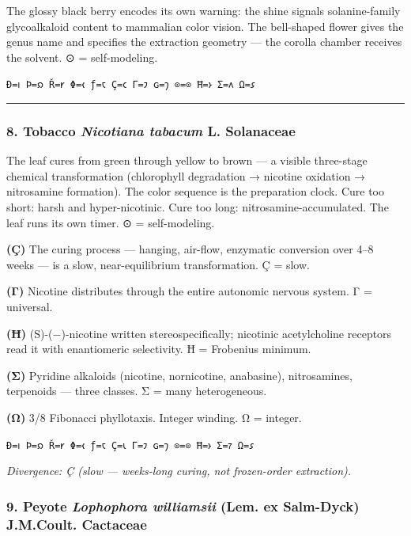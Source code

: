 The glossy black berry encodes its own warning: the shine signals
solanine-family glycoalkaloid content to mammalian color vision. The
bell-shaped flower gives the genus name and specifies the extraction
geometry --- the corolla chamber receives the solvent. ⊙ =
self-modeling.

\texttt{Ð=𐑦\ Þ=𐑸\ Ř=𐑾\ Φ=𐑬\ ƒ=𐑱\ Ç=𐑤\ Γ=𐑲\ ɢ=𐑠\ ⊙=⊙\ Ħ=𐑶\ Σ=𐑵\ Ω=𐑭}

\begin{center}\rule{0.5\linewidth}{0.5pt}\end{center}

\hypertarget{tobacco-nicotiana-tabacum-l.-solanaceae}{%
\subsubsection{\texorpdfstring{8. Tobacco \textbar{} \emph{Nicotiana
tabacum} L. \textbar{}
Solanaceae}{8. Tobacco \textbar{} Nicotiana tabacum L. \textbar{} Solanaceae}}\label{tobacco-nicotiana-tabacum-l.-solanaceae}}

The leaf cures from green through yellow to brown --- a visible
three-stage chemical transformation (chlorophyll degradation → nicotine
oxidation → nitrosamine formation). The color sequence is the
preparation clock. Cure too short: harsh and hyper-nicotinic. Cure too
long: nitrosamine-accumulated. The leaf runs its own timer. ⊙ =
self-modeling.

\textbf{(Ç)} The curing process --- hanging, air-flow, enzymatic
conversion over 4--8 weeks --- is a slow, near-equilibrium
transformation. Ç = slow.

\textbf{(Γ)} Nicotine distributes through the entire autonomic nervous
system. Γ = universal.

\textbf{(Ħ)} (S)-(−)-nicotine written stereospecifically; nicotinic
acetylcholine receptors read it with enantiomeric selectivity. Ħ =
Frobenius minimum.

\textbf{(Σ)} Pyridine alkaloids (nicotine, nornicotine, anabasine),
nitrosamines, terpenoids --- three classes. Σ = many heterogeneous.

\textbf{(Ω)} 3/8 Fibonacci phyllotaxis. Integer winding. Ω = integer.

\texttt{Ð=𐑦\ Þ=𐑸\ Ř=𐑾\ Φ=𐑬\ ƒ=𐑱\ Ç=𐑧\ Γ=𐑲\ ɢ=𐑠\ ⊙=⊙\ Ħ=𐑶\ Σ=𐑳\ Ω=𐑭}

\emph{Divergence: Ç (slow --- weeks-long curing, not frozen-order
extraction).}

\hypertarget{peyote-lophophora-williamsii-lem.-ex-salm-dyck-j.m.coult.-cactaceae}{%
\subsubsection{\texorpdfstring{9. Peyote \textbar{} \emph{Lophophora
williamsii} (Lem. ex Salm-Dyck) J.M.Coult. \textbar{}
Cactaceae}{9. Peyote \textbar{} Lophophora williamsii (Lem. ex Salm-Dyck) J.M.Coult. \textbar{} Cactaceae}}\label{peyote-lophophora-williamsii-lem.-ex-salm-dyck-j.m.coult.-cactaceae}}

